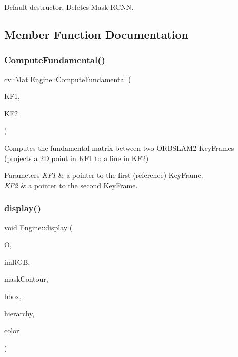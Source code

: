 Default destructor, Deletes Mask-\/\+R\+C\+NN. 

\subsection{Member Function Documentation}
\mbox{\label{classEngine_a381792d9c8cf59c365aa9ef5ff1841fb}} 
\subsubsection{\texorpdfstring{Compute\+Fundamental()}{ComputeFundamental()}}
{\footnotesize\ttfamily cv\+::\+Mat Engine\+::\+Compute\+Fundamental (\begin{DoxyParamCaption}\item[{Key\+Frame $\ast$}]{K\+F1,  }\item[{Key\+Frame $\ast$}]{K\+F2 }\end{DoxyParamCaption})}

Computes the fundamental matrix between two O\+R\+B\+S\+L\+A\+M2 Key\+Frames (projects a 2D point in K\+F1 to a line in K\+F2) 
\begin{DoxyParams}{Parameters}
{\em K\+F1} & a pointer to the first (reference) Key\+Frame. \\
\hline
{\em K\+F2} & a pointer to the second Key\+Frame. \\
\hline
\end{DoxyParams}
\mbox{\label{classEngine_a45c5502ceecdd852f9417ed0d7c73648}} 
\subsubsection{\texorpdfstring{display()}{display()}}
{\footnotesize\ttfamily void Engine\+::display (\begin{DoxyParamCaption}\item[{\hyperlink{classObject}{Object} $\ast$}]{O,  }\item[{cv\+::\+Mat}]{im\+R\+GB,  }\item[{Contour}]{mask\+Contour,  }\item[{cv\+::\+Rect}]{bbox,  }\item[{std\+::vector$<$ cv\+::\+Vec4i $>$}]{hierarchy,  }\item[{cv\+::\+Scalar}]{color }\end{DoxyParamCaption})}

